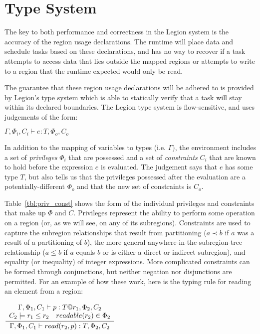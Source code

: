 \section{Type System}
\label{sec:type}

The key to both performance and correctness in the Legion system is the
accuracy of the region usage declarations.  The runtime will place data and
schedule tasks based on these declarations, and has no way to recover if a 
task attempts to access data that lies outside the mapped regions or attempts
to write to a region that the runtime expected would only be read.

The guarantee that these region usage declarations will be adhered to is
provided by Legion's type system which is able to statically verify that a 
task will stay within its declared boundaries.  The Legion type system is
flow-sensitive, and uses judgements of the form:

\begin{center}
$\Gamma, \Phi_i, C_i \vdash e : T, \Phi_o, C_o$
\end{center}

In addition to the mapping of variables to types (i.e. $\Gamma$), the
environment includes a set of \emph{privileges} $\Phi_i$ that are possessed
and a set of \emph{constraints} $C_i$ that are known to hold before the 
expression $e$ is evaluated.  The judgement says that $e$ has some type $T$,
but also tells us that the privileges possessed after the
evaluation are a potentially-different $\Phi_o$ and that the new set of 
constraints is $C_o$.

Table~\ref{tbl:priv_const} shows the form of the individual privileges and
constraints that make up $\Phi$ and $C$.  Privileges represent the ability to
perform some operation on a region (or, as we will see, on any of its
subregions).  Constraints are used to capture the subregion relationships that
result from partitioning ($a \prec b$ if $a$ was a result of a partitioning of
$b$), the more general anywhere-in-the-subregion-tree relationship ($a \le b$ if $a$ equals $b$ or is either a direct or indirect subregion), and equality (or
inequality) of integer expressions.  More complicated constraints can be formed
through conjunctions, but neither negation nor disjunctions are permitted.  For
an example of how these work, here is the typing rule for reading an element
from a region:

\begin{center}
{\small
\begin{math}
\infrule{
\begin{array}{lc}
  \multicolumn{2}{c}{\Gamma, \Phi_1, C_1 \vdash p : T@r_1, \Phi_2, C_2} \\
  C_2 \models r_1 \le r_2 & readable(r_2) \in \Phi_2
\end{array}
}
{
  \Gamma, \Phi_1, C_1 \vdash read(r_2, p) : T, \Phi_2, C_2
}
\end{math} 
}
\end{center}

